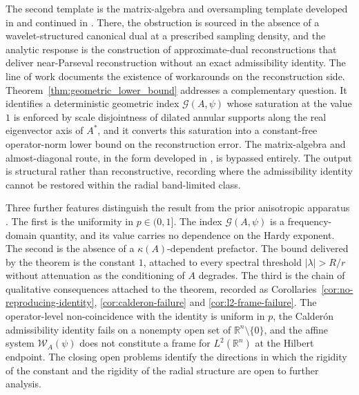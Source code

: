 \documentclass[pdflatex,sn-basic,Numbered]{sn-jnl}
\theoremstyle{thmstyleone}%
\theoremstyle{thmstylethree}%
\begin{document}
The second template is the matrix-algebra and oversampling template
developed in \cite{DAUBECHIES2002269,Bownik2012,Feichtinger2013}
and continued in \cite{BENAVENTE2022125841,KHOLE2020,Younu2018}. There,
the obstruction is sourced in the absence of a wavelet-structured
canonical dual at a prescribed sampling density, and the analytic
response is the construction of approximate-dual reconstructions that
deliver near-Parseval reconstruction without an exact admissibility
identity. The line of work documents the existence of workarounds on
the reconstruction side. Theorem~\ref{thm:geometric_lower_bound}
addresses a complementary question. It identifies a deterministic
geometric index $\mathcal{G}(A, \psi)$ whose saturation at the value
$1$ is enforced by scale disjointness of dilated annular supports
along the real eigenvector axis of $A^{*}$, and it converts this
saturation into a constant-free operator-norm lower bound on the
reconstruction error. The matrix-algebra and almost-diagonal route, in
the form developed in \cite{Grafakos2001,Grohs2014,Bu2025}, is bypassed
entirely. The output is structural rather than reconstructive,
recording where the admissibility identity cannot be restored within
the radial band-limited class.

Three further features distinguish the result from the prior
anisotropic apparatus \cite{Bownik2003,Bownik2007,BownikHo2005,
	Baode2015,BownikWang2023,Easley2012,Guo2004,ATREAS20191}. The first is
the uniformity in $p \in (0, 1]$. The index $\mathcal{G}(A, \psi)$ is a
frequency-domain quantity, and its value carries no dependence on the
Hardy exponent. The second is the absence of a $\kappa(A)$-dependent
prefactor. The bound delivered by the theorem is the constant $1$,
attached to every spectral threshold $|\lambda| > R / r$ without
attenuation as the conditioning of $A$ degrades. The third is the
chain of qualitative consequences attached to the theorem, recorded as
Corollaries~\ref{cor:no-reproducing-identity},
\ref{cor:calderon-failure} and \ref{cor:l2-frame-failure}. The
operator-level non-coincidence with the identity is uniform in $p$, the
Calder\'on admissibility identity fails on a nonempty open set of
$\mathbb{R}^n \setminus \{0\}$, and the affine system
$\mathcal{W}_A(\psi)$ does not constitute a frame for
$L^2(\mathbb{R}^n)$ at the Hilbert endpoint. The closing open problems
identify the directions in which the rigidity of the constant and the
rigidity of the radial structure are open to further analysis.

\medskip
\end{document}
